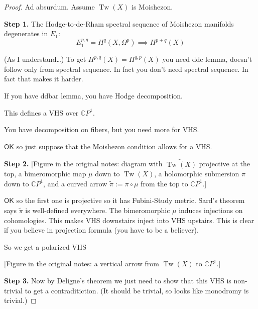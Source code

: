 \begin{proof}
Ad absurdum. Assume $\operatorname{Tw}(X)$ is
Moishezon.

\medskip\noindent
{\bf Step 1.}
The Hodge-to-de-Rham spectral sequence of
Moishezon manifolds degenerates in $E_1$:
$$
E^{p,q}_1=H^{q}(X,\Omega^p)\implies
H^{p+q}(X)
$$

\begin{remark}[Misha]
\label{remark-tw-misha-ddc}
(As I understand…) To get
$H^{p,q}(X)=H^{q,p}(X)$ you need ddc lemma,
doesn't follow only from spectral sequence.
In fact you don't need spectral sequence. In
fact that makes it harder.
\end{remark}

\begin{remark}[Mitia]
\label{remark-tw-mitia-ddbar}
If you have ddbar lemma, you have Hodge
decomposition.
\end{remark}

This defines a VHS over $\mathbb{C}P^{1}$.

\begin{remark}[André]
\label{remark-tw-andre-vhs}
You have decomposition on fibers, but you
need more for VHS.
\end{remark}

$\mathsf{OK}$ so just suppose that the
Moishezon condition allows for a VHS.

\medskip\noindent
{\bf Step 2.}
[Figure in the original notes: diagram with
$\widetilde{\operatorname{Tw}(X)}$ projective
at the top, a bimeromorphic map $\mu$ down to
$\operatorname{Tw}(X)$, a holomorphic
submersion $\pi$ down to $\mathbb{C}P^{1}$,
and a curved arrow $\tilde{\pi}:=\pi\circ
\mu$ from the top to $\mathbb{C}P^{1}$.]

$\mathsf{OK}$ so the first one is projective
so it has Fubini-Study metric. Sard's theorem
says $\tilde{\pi}$ is well-defined
everywhere. The bimeromorphic $\mu$ induces
injections on cohomologies. This makes VHS
downstairs inject into VHS upstairs. This is
clear if you believe in projection formula
(you have to be a believer).

So we get a polarized VHS

[Figure in the original notes: a vertical
arrow from $\operatorname{Tw}(X)$ to
$\mathbb{C}P^{1}$.]

\medskip\noindent
{\bf Step 3.}
Now by Deligne's theorem we just need to show
that this VHS is non-trivial to get a
contraditiction. (It should be trivial, so
looks like monodromy is trivial.)


\end{proof}
